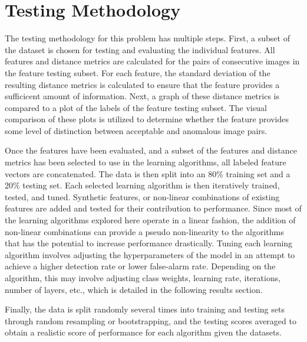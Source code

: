 \section{Testing Methodology}

The testing methodology for this problem has multiple steps.
First, a subset of the dataset is chosen for testing and evaluating the individual features.
All features and distance metrics are calculated for the pairs of consecutive images in the feature testing subset.
For each feature, the standard deviation of the resulting distance metrics is calculated to ensure that the feature provides a sufficicent amount of information.
Next, a graph of these distance metrics is compared to a plot of the labels of the feature testing subset.
The visual comparison of these plots is utilized to determine whether the feature provides some level of distinction between acceptable and anomalous image pairs.

Once the features have been evaluated, and a subset of the features and distance metrics has been selected to use in the learning algorithms, all labeled feature vectors are concatenated.
The data is then split into an 80\% training set and a 20\% testing set.
Each selected learning algorithm is then iteratively trained, tested, and tuned.
Synthetic features, or non-linear combinations of existing features are added and tested for their contribution to performance.
Since most of the learning algorithms explored here operate in a linear fashion, the addition of non-linear combinations can provide a pseudo non-linearity to the algorithms that has the potential to increase performance drastically.
Tuning each learning algorithm involves adjusting the hyperparameters of the model in an attempt to achieve a higher detection rate or lower false-alarm rate.
Depending on the algorithm, this may involve adjusting class weights, learning rate, iterations, number of layers, etc., which is detailed in the following results section.

Finally, the data is split randomly several times into training and testing sets through random resampling or bootstrapping, and the testing scores averaged to obtain a realistic score of performance for each algorithm given the datasets.

